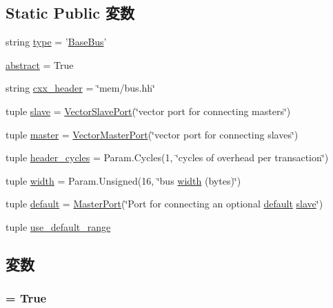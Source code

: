\subsection*{Static Public 変数}
\begin{DoxyCompactItemize}
\item 
string \hyperlink{classBus_1_1BaseBus_acce15679d830831b0bbe8ebc2a60b2ca}{type} = '\hyperlink{classBus_1_1BaseBus}{BaseBus}'
\item 
\hyperlink{classBus_1_1BaseBus_a17fa61ac3806b481cafee5593b55e5d0}{abstract} = True
\item 
string \hyperlink{classBus_1_1BaseBus_a17da7064bc5c518791f0c891eff05fda}{cxx\_\-header} = \char`\"{}mem/bus.hh\char`\"{}
\item 
tuple \hyperlink{classBus_1_1BaseBus_a9b8cb1f697e86858437a78f041478c9b}{slave} = \hyperlink{classm5_1_1params_1_1VectorSlavePort}{VectorSlavePort}(\char`\"{}vector port for connecting masters\char`\"{})
\item 
tuple \hyperlink{classBus_1_1BaseBus_a0f74d64e6817f0f89bafc52ff3c56cbb}{master} = \hyperlink{classm5_1_1params_1_1VectorMasterPort}{VectorMasterPort}(\char`\"{}vector port for connecting slaves\char`\"{})
\item 
tuple \hyperlink{classBus_1_1BaseBus_a955befffdaffa7d3695a8a6730cb058e}{header\_\-cycles} = Param.Cycles(1, \char`\"{}cycles of overhead per transaction\char`\"{})
\item 
tuple \hyperlink{classBus_1_1BaseBus_a397bb3beea7b21f074bc75e1e71f132f}{width} = Param.Unsigned(16, \char`\"{}bus \hyperlink{classBus_1_1BaseBus_a397bb3beea7b21f074bc75e1e71f132f}{width} (bytes)\char`\"{})
\item 
tuple \hyperlink{classBus_1_1BaseBus_a3abc3c22bdb6b98ef48db57a33e92331}{default} = \hyperlink{classm5_1_1params_1_1MasterPort}{MasterPort}(\char`\"{}Port for connecting an optional \hyperlink{classBus_1_1BaseBus_a3abc3c22bdb6b98ef48db57a33e92331}{default} \hyperlink{classBus_1_1BaseBus_a9b8cb1f697e86858437a78f041478c9b}{slave}\char`\"{})
\item 
tuple \hyperlink{classBus_1_1BaseBus_a8268ad9a1e448ea77532ff46923f34b4}{use\_\-default\_\-range}
\end{DoxyCompactItemize}


\subsection{変数}
\hypertarget{classBus_1_1BaseBus_a17fa61ac3806b481cafee5593b55e5d0}{
\subsubsection[{abstract}]{ = True}}
\label{classBus_1_1BaseBus_a17fa61ac3806b481cafee5593b55e5d0}


